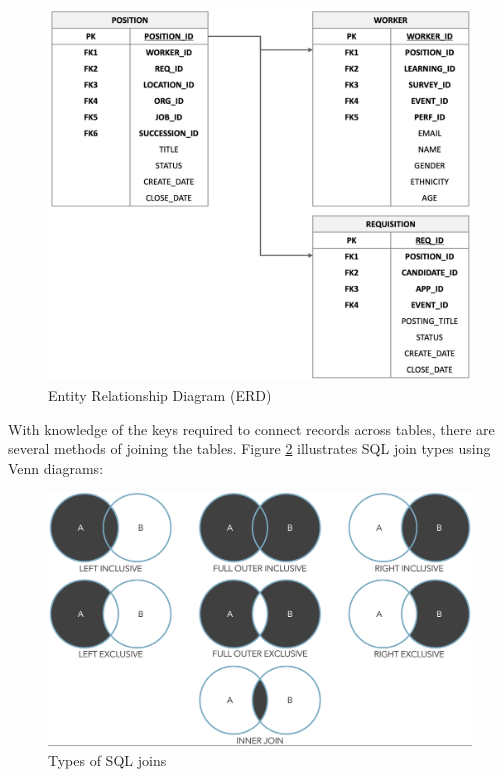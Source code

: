 \documentclass[
]{book}
\begin{document}
\begin{figure}

{\centering \includegraphics[width=0.75\linewidth]{graphics/dw_erd} 

}

\caption{Entity Relationship Diagram (ERD)}\label{fig:erd}
\end{figure}

With knowledge of the keys required to connect records across tables, there are several methods of joining the tables. Figure \ref{fig:sql-joins} illustrates SQL join types using Venn diagrams:

\begin{figure}

{\centering \includegraphics[width=1\linewidth]{graphics/sql_joins} 

}

\caption{Types of SQL joins}\label{fig:sql-joins}
\end{figure}
\end{document}
